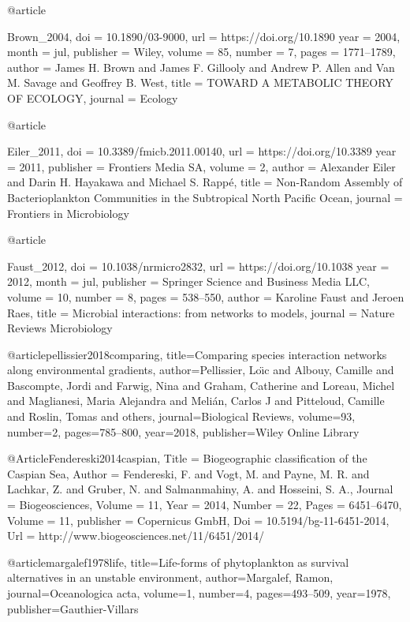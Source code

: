 {{{{{{{{{{{{{{{{{@article{Brown_2004,
	doi = {10.1890/03-9000},
	url = {https://doi.org/10.1890%
	year = 2004,
	month = {jul},
	publisher = {Wiley},
	volume = {85},
	number = {7},
	pages = {1771--1789},
	author = {James H. Brown and James F. Gillooly and Andrew P. Allen and Van M. Savage and Geoffrey B. West},
	title = {{TOWARD} A {METABOLIC} {THEORY} {OF} {ECOLOGY}},
	journal = {Ecology}
}


@article{Eiler_2011,
	doi = {10.3389/fmicb.2011.00140},
	url = {https://doi.org/10.3389%
	year = 2011,
	publisher = {Frontiers Media {SA}},
	volume = {2},
	author = {Alexander Eiler and Darin H. Hayakawa and Michael S. Rapp{\'{e}}},
	title = {Non-Random Assembly of Bacterioplankton Communities in the Subtropical North Pacific Ocean},
	journal = {Frontiers in Microbiology}
}

@article{Faust_2012,
	doi = {10.1038/nrmicro2832},
	url = {https://doi.org/10.1038%
	year = 2012,
	month = {jul},
	publisher = {Springer Science and Business Media {LLC}},
	volume = {10},
	number = {8},
	pages = {538--550},
	author = {Karoline Faust and Jeroen Raes},
	title = {Microbial interactions: from networks to models},
	journal = {Nature Reviews Microbiology}
}

@article{pellissier2018comparing,
  title={Comparing species interaction networks along environmental gradients},
  author={Pellissier, Lo{\"\i}c and Albouy, Camille and Bascompte, Jordi and Farwig, Nina and Graham, Catherine and Loreau, Michel and Maglianesi, Maria Alejandra and Meli{\'a}n, Carlos J and Pitteloud, Camille and Roslin, Tomas and others},
  journal={Biological Reviews},
  volume={93},
  number={2},
  pages={785--800},
  year={2018},
  publisher={Wiley Online Library}
}


@Article{Fendereski2014caspian,
  Title                    = {Biogeographic classification of the Caspian Sea},
  Author                   = {Fendereski, F. and Vogt, M. and Payne, M. R. and Lachkar, Z. and Gruber, N. and Salmanmahiny, A. and Hosseini, S. A.},
  Journal                  = {Biogeosciences},
  Volume				   = {11},
  Year                     = {2014},
  Number                   = {22},
  Pages                    = {6451--6470},
  Volume                   = {11},
  publisher				   = {Copernicus GmbH},
  Doi                      = {10.5194/bg-11-6451-2014},
  Url                      = {http://www.biogeosciences.net/11/6451/2014/}
}

@article{margalef1978life,
  title={Life-forms of phytoplankton as survival alternatives in an unstable environment},
  author={Margalef, Ramon},
  journal={Oceanologica acta},
  volume={1},
  number={4},
  pages={493--509},
  year={1978},
  publisher={Gauthier-Villars}
}


}}}}}}}}}}}}}}}}}}}}
